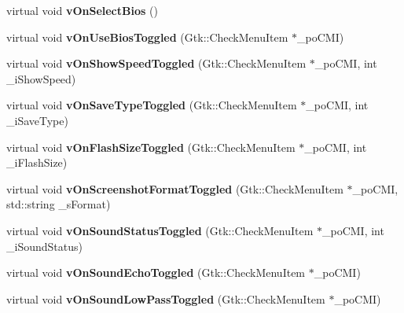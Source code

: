 \begin{DoxyCompactItemize}
virtual void {\bfseries v\+On\+Select\+Bios} ()
\item 
\mbox{\label{class_v_b_a_1_1_window_a4c3cba9990c0f7315b49d2c8d338280b}} 
virtual void {\bfseries v\+On\+Use\+Bios\+Toggled} (Gtk\+::\+Check\+Menu\+Item $\ast$\+\_\+po\+C\+MI)
\item 
\mbox{\label{class_v_b_a_1_1_window_a81a46aa6f68c512ed86aa04ca13dbd71}} 
virtual void {\bfseries v\+On\+Show\+Speed\+Toggled} (Gtk\+::\+Check\+Menu\+Item $\ast$\+\_\+po\+C\+MI, int \+\_\+i\+Show\+Speed)
\item 
\mbox{\label{class_v_b_a_1_1_window_ac28bedaab2e51b684869e85b4b20b7be}} 
virtual void {\bfseries v\+On\+Save\+Type\+Toggled} (Gtk\+::\+Check\+Menu\+Item $\ast$\+\_\+po\+C\+MI, int \+\_\+i\+Save\+Type)
\item 
\mbox{\label{class_v_b_a_1_1_window_a592d046d6e85921562d26285387cc45a}} 
virtual void {\bfseries v\+On\+Flash\+Size\+Toggled} (Gtk\+::\+Check\+Menu\+Item $\ast$\+\_\+po\+C\+MI, int \+\_\+i\+Flash\+Size)
\item 
\mbox{\label{class_v_b_a_1_1_window_a8536700b1c3ab6cd07b8fd14bf3d3d82}} 
virtual void {\bfseries v\+On\+Screenshot\+Format\+Toggled} (Gtk\+::\+Check\+Menu\+Item $\ast$\+\_\+po\+C\+MI, std\+::string \+\_\+s\+Format)
\item 
\mbox{\label{class_v_b_a_1_1_window_af883be4dc5fbd611a2b5610aa26cfff7}} 
virtual void {\bfseries v\+On\+Sound\+Status\+Toggled} (Gtk\+::\+Check\+Menu\+Item $\ast$\+\_\+po\+C\+MI, int \+\_\+i\+Sound\+Status)
\item 
\mbox{\label{class_v_b_a_1_1_window_acf58efc519acc8f3fd42b0e3481eff23}} 
virtual void {\bfseries v\+On\+Sound\+Echo\+Toggled} (Gtk\+::\+Check\+Menu\+Item $\ast$\+\_\+po\+C\+MI)
\item 
\mbox{\label{class_v_b_a_1_1_window_a424a694cc0b0e3cb750ed07457b2b11e}} 
virtual void {\bfseries v\+On\+Sound\+Low\+Pass\+Toggled} (Gtk\+::\+Check\+Menu\+Item $\ast$\+\_\+po\+C\+MI)
\item 
\mbox{\label{class_v_b_a_1_1_window_a1b7f801dd8f6c48c9161314e4ed266ed}} 

\end{DoxyCompactItemize}
